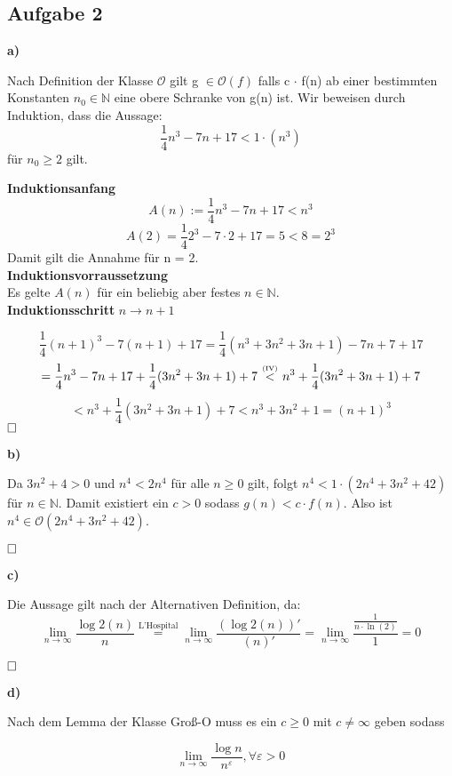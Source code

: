 \documentclass[a4paper,graphics,11pt]{article}
\newcommand{\aufgabe}[1]{\subsection*{Aufgabe #1}}
\newcommand{\up}[2]{\mathrel{\overset{\makebox[0pt]{\mbox{\normalfont\tiny #2}}}{#1}}}
\begin{document}
\aufgabe{2} 
\textbf{a)}

Nach Definition der Klasse $\mathcal{O}$ gilt g $\in \mathcal{O}(f)$ falls c $\cdot$ f(n) ab einer bestimmten Konstanten $n_0 \in \mathbb{N}$ eine obere Schranke von g(n) ist. Wir beweisen durch Induktion, dass die Aussage:
$$
	\frac{1}{4}n^3-7n+17 < 1\cdot(n^3)
$$
für $n_0 \ge 2$ gilt.\\

\begin{minipage}{1\linewidth}
	\textbf{Induktionsanfang}\\
	$$
		A(n) := \frac{1}{4}n^3-7n+17 < n^3  
	$$$$
		A(2) = \frac{1}{4} 2^3-7\cdot2+17 = 5 < 8 = 2^3
	$$
	Damit gilt die Annahme für n = 2.\\
	
	\textbf{Induktionsvorraussetzung}\\
	
	Es gelte $A(n)$ für ein beliebig aber festes $n \in \mathbb{N}$.\\
	
	\textbf{Induktionsschritt} $n \to n+1$
	
	$$
	\frac{1}{4}(n+1)^3-7(n+1)+17 = \frac{1}{4}(n^3+3n^2+3n+1)-7n+7+17
	$$$$
	=\frac{1}{4}n^3-7n+17+\frac{1}{4}(3n^2+3n+1)+7\ \up{<}{(IV)}\ n^3+\frac{1}{4}(3n^2+3n+1)+7
	$$$$
	< n^3+\frac{1}{4}(3n^2+3n+1)+7 < n^3 +3n^2+1 = (n+1)^3
	$$
	$\hfill\square$
	
\end{minipage}

\textbf{b)}

Da $3n^2+4 > 0$ und $ n^4 < 2n^4 $ für alle $n \geq 0$ gilt, folgt
$n^4 < 1 \cdot(2n^4+3n^2+42)$ für $n \in \mathbb{N}$. Damit existiert ein $c > 0$ sodass $g(n) < c \cdot f(n)$. Also ist $n^4 \in \mathcal{O}(2n^4+3n^2+42)$.

$\hfill\square$



\textbf{c)}

Die Aussage gilt nach der Alternativen Definition, da:
$$
\lim_{n\rightarrow\infty} \frac{\log2(n)}{n} \overset{\text{L'Hospital}}{=} \lim_{n\rightarrow\infty} \frac{(\log2(n))'}{(n)'} = \lim_{n\rightarrow\infty} \frac{\frac{1}{n\cdot \ln(2)}}{1} = 0
$$

$\hfill\square$

\newpage

\textbf{d)}

Nach dem Lemma der Klasse Groß-O muss es ein $c \geq 0$ mit $c \neq \infty$ geben sodass

$$
\lim_{n\rightarrow\infty} \frac{\log n}{n^\varepsilon}, \forall \varepsilon > 0
$$
\end{document}
